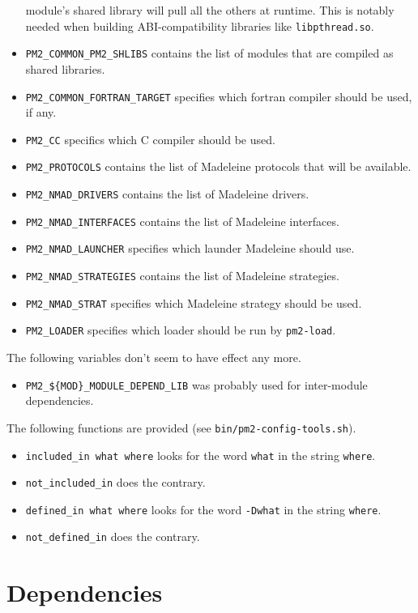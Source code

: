 \documentclass[11pt, a4paper ,twoside]{article}
\begin{document}
\begin{itemize}
module's shared library will pull all the others at runtime.  This is
notably needed when building ABI-compatibility libraries like
\verb+libpthread.so+.
\item \verb+PM2_COMMON_PM2_SHLIBS+ contains the list of modules that are
compiled as shared libraries.
\item \verb+PM2_COMMON_FORTRAN_TARGET+ specifies which fortran compiler
should be used, if any.
\item \verb+PM2_CC+ specifics which C compiler should be used.
\item \verb+PM2_PROTOCOLS+ contains the list of Madeleine protocols that
will be available.
\item \verb+PM2_NMAD_DRIVERS+ contains the list of Madeleine drivers.
\item \verb+PM2_NMAD_INTERFACES+ contains the list of Madeleine
interfaces.
\item \verb+PM2_NMAD_LAUNCHER+ specifies which launder Madeleine should
use.
\item \verb+PM2_NMAD_STRATEGIES+ contains the list of Madeleine
strategies.
\item \verb+PM2_NMAD_STRAT+ specifies which Madeleine strategy should
be used.
\item \verb+PM2_LOADER+ specifies which loader should be run by
\verb+pm2-load+.
\end{itemize}

The following variables don't seem to have effect any more.
\begin{itemize}
\item \verb+PM2_${MOD}_MODULE_DEPEND_LIB+ was probably used for
inter-module dependencies.
\end{itemize}

The following functions are provided (see \verb+bin/pm2-config-tools.sh+).
\begin{itemize}
\item \verb+included_in what where+ looks for the word \verb+what+ in
the string \verb+where+.
\item \verb+not_included_in+ does the contrary.
\item \verb+defined_in what where+ looks for the word \verb+-Dwhat+ in
the string \verb+where+.
\item \verb+not_defined_in+ does the contrary.
\end{itemize}


\section{Dependencies}
\end{document}
